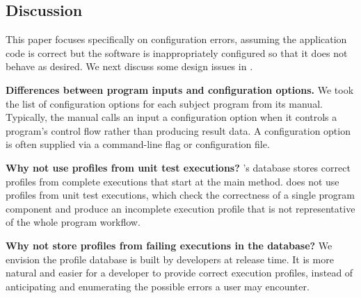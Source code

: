 \subsection{Discussion}

This paper focuses specifically on configuration errors,
assuming the application code is correct but the software		
is inappropriately configured so that it does not		
behave as desired. We next discuss some design issues in \ourtool.

\vspace{0.5mm}
\noindent \textbf{Differences between program inputs and configuration options.}
We took the list of configuration options for each subject program from its
manual.  Typically, the manual calls an input a configuration option when
it controls a program's control flow rather than producing result data.  A
configuration option is often supplied via a command-line flag or
configuration file.



\vspace{0.5mm}
\noindent \textbf{Why not use profiles from unit test executions?}
\ourtool's database stores correct profiles from complete 
executions that start at the main method.
\ourtool does not use profiles from unit test executions, which check the
correctness
of a single program component and produce
an incomplete execution profile that is not representative of
the whole program workflow. 



\vspace{0.5mm}
\noindent \textbf{Why not store profiles from failing executions in the database?}
We envision the profile database is built by developers at release time.
It is more natural and easier for a developer to provide correct execution
profiles, instead of anticipating and enumerating the possible
errors a user may encounter.

